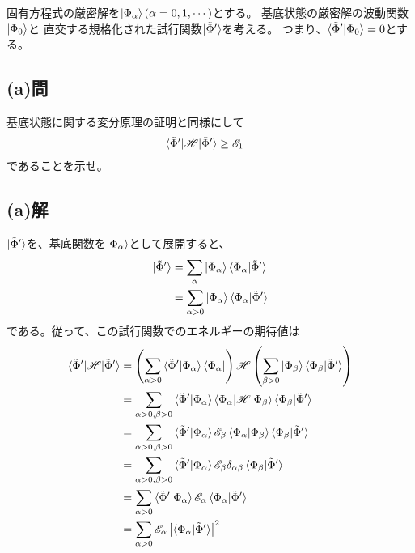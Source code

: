 固有方程式の厳密解を$\ket{\Phi_{\alpha}}(\alpha=0,1,\cdots)$とする。
基底状態の厳密解の波動関数$\ket{\Phi_0}$と
直交する規格化された試行関数$\ket{\tilde{\Phi}'}$を考える。
つまり、$\braket{\tilde{\Phi}'|\Phi_0}=0$とする。

\subsection{(a)問}
基底状態に関する変分原理の証明と同様にして
\begin{align}
	\braket{\tilde{\Phi}'|\mathscr{H}|\tilde{\Phi}'}
&\geq
	\mathscr{E}_1
\end{align}
であることを示せ。

\subsection{(a)解}
$\ket{\tilde{\Phi}'}$を、基底関数を$\ket{\Phi_{\alpha}}$として展開すると、
\begin{align}
	\ket{\tilde{\Phi}'}
&=
	\sum_{\alpha} \ket{\Phi_{\alpha}} \braket{\Phi_{\alpha}|\tilde{\Phi}'} \\
%
%
&=
	\sum_{\alpha>0} \ket{\Phi_{\alpha}} \braket{\Phi_{\alpha}|\tilde{\Phi}'}
\end{align}
である。従って、この試行関数でのエネルギーの期待値は
\begin{align}
	\braket{\tilde{\Phi}'|\mathscr{H}|\tilde{\Phi}'}
&=
	\left(
		\sum_{\alpha>0}
			\braket{\tilde{\Phi}'|\Phi_{\alpha}} \bra{\Phi_{\alpha}}
	\right)
		\mathscr{H}
		\left(
			\sum_{\beta>0}
				\ket{\Phi_{\beta}} \braket{\Phi_{\beta}|\tilde{\Phi}'}
		\right) \\
%
%
&=
	\sum_{\alpha>0,\beta>0}
		\braket{\tilde{\Phi}'|\Phi_{\alpha}}
			\braket{\Phi_{\alpha}|\mathscr{H}|\Phi_{\beta}}
			\braket{\Phi_{\beta}|\tilde{\Phi}'} \\
%
%
&=
	\sum_{\alpha>0,\beta>0}
		\braket{\tilde{\Phi}'|\Phi_{\alpha}}
			\mathscr{E}_{\beta} \braket{\Phi_{\alpha}|\Phi_{\beta}}
			\braket{\Phi_{\beta}|\tilde{\Phi}'} \\
%
%
&=
	\sum_{\alpha>0,\beta>0}
		\braket{\tilde{\Phi}'|\Phi_{\alpha}}
			\mathscr{E}_{\beta} \delta_{\alpha\beta}
			\braket{\Phi_{\beta}|\tilde{\Phi}'} \\
%
%
&=
	\sum_{\alpha>0}
		\braket{\tilde{\Phi}'|\Phi_{\alpha}}
			\mathscr{E}_{\alpha}
			\braket{\Phi_{\alpha}|\tilde{\Phi}'} \\
%
%
&=
	\sum_{\alpha>0}
		\mathscr{E}_{\alpha}
			\left|\braket{\Phi_{\alpha}|\tilde{\Phi}'}\right|^2
\end{align}
